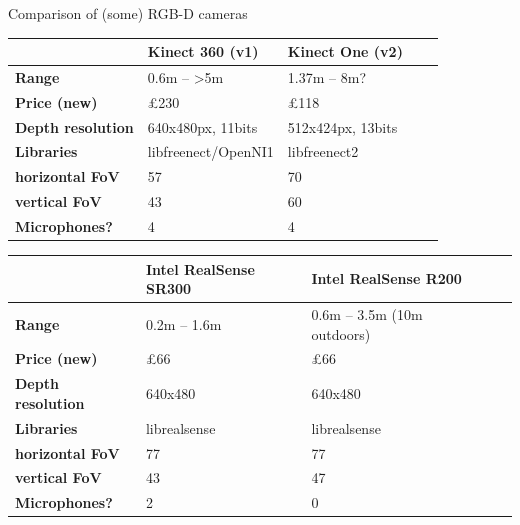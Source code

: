 \documentclass[compress]{beamer}
\begin{document}
\begin{frame}{Comparison of (some) RGB-D cameras}
    \begin{table}[]
        \centering
        \scriptsize
        \begin{tabular}{@{}lllll@{}}
            \toprule
                             & Kinect 360 (v1)        & Kinect One (v2)   \\ \midrule
            {\bf Range}            & 0.6m -- \textgreater5m & 1.37m -- 8m?      \\
            {\bf Price (new)}      & £230                   & £118               \\
            {\bf Depth resolution} & 640x480px, 11bits      & 512x424px, 13bits  \\
            {\bf Libraries}        & libfreenect/OpenNI1    & libfreenect2       \\
            {\bf horizontal FoV}   & 57                     & 70                 \\
            {\bf vertical FoV}     & 43                     & 60                 \\
            {\bf Microphones?}     & 4                      & 4                 \\ \bottomrule
        \end{tabular}
        \begin{tabular}{@{}lllll@{}}
            \toprule
                             & Intel RealSense SR300 & Intel RealSense R200        \\ \midrule
            {\bf Range}            & 0.2m – 1.6m           & 0.6m -- 3.5m (10m outdoors) \\
            {\bf Price (new)}      & £66 & £66                         \\
            {\bf Depth resolution} & 640x480               & 640x480                     \\
            {\bf Libraries}        & librealsense   & librealsense         \\
            {\bf horizontal FoV}   & 77 & 77                          \\
            {\bf vertical FoV}     & 43 & 47                          \\
            {\bf Microphones?}     & 2 & 0                           \\ \bottomrule
        \end{tabular}
    \end{table}
\end{frame}
\end{document}
